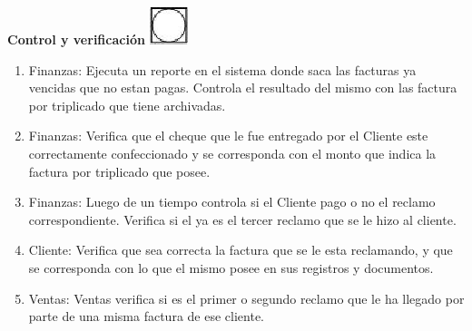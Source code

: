 \begin{center}
  \textbf{Control y verificación}
  \includegraphics{./Images/Simbolos/simbolo-Control-y-Verificacion.png}
\end{center}
\begin{enumerate}
\item Finanzas: Ejecuta un reporte en el sistema donde saca las facturas ya vencidas que no estan pagas. Controla el resultado del mismo con las factura por triplicado que tiene archivadas.
\item Finanzas: Verifica que el cheque que le fue entregado por el Cliente este correctamente confeccionado y se corresponda con el monto que indica la factura por triplicado que posee.
\item Finanzas: Luego de un tiempo controla si el Cliente pago o no el reclamo correspondiente. Verifica si el ya es el tercer reclamo que se le hizo al cliente.
\item Cliente: Verifica que sea correcta la factura que se le esta reclamando, y que se corresponda con lo que el mismo posee en sus registros y documentos.
\item Ventas: Ventas verifica si es el primer o segundo reclamo que le ha llegado por parte de una misma factura de ese cliente.
\end{enumerate}

